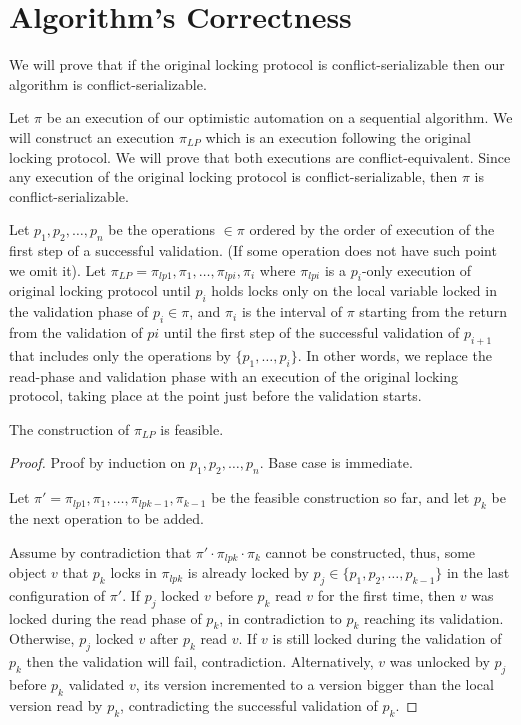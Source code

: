 \section{Algorithm's Correctness} 
We will prove that if the original locking protocol is 
conflict-serializable then our algorithm is conflict-serializable.

Let $\pi$ be an execution of our optimistic automation on a 
sequential algorithm. We will construct an execution $\pi_{LP}$ 
which is an execution following the original locking protocol. 
We will prove that both executions are conflict-equivalent. 
Since any execution of the original locking protocol
is conflict-serializable, then $\pi$ is conflict-serializable. 

Let $p_1,p_2,\ldots,p_n$ be the operations $\in\pi$ ordered by the 
order of execution of the first step of a successful \readSet 
validation. (If some operation does not have such point we omit it).
Let $\pi_{LP} = \pi_{lp1},\pi_{1},\ldots,\pi_{lpi},\pi_{i}$ where 
$\pi_{lpi}$ is a $p_i$-only execution of original locking protocol 
until $p_i$ holds locks only on the local variable locked
in the validation phase of $p_i \in \pi$, and $\pi_i$ is
the interval of $\pi$ starting from the return from the validation of
$pi$ until the first step of the successful \readSet validation of 
$p_{i+1}$ that includes only the operations by $\{p_1,\ldots,p_i\}$.
In other words, we replace the read-phase and validation phase with 
an execution of the original locking protocol, 
taking place at the point just before the \readSet validation starts. 

\begin{lemma}
The construction of $\pi_{LP}$ is feasible.  
\end{lemma}
\begin{proof}
Proof by induction on $p_1,p_2,\ldots,p_n$. Base case is immediate. 

Let $\pi' = \pi_{lp1},\pi_{1},\ldots,\pi_{lpk-1},\pi_{k-1}$ be the feasible
construction so far, and let $p_{k}$ be the next operation to be 
added. 

Assume by contradiction that $\pi'\cdot\pi_{lpk}\cdot\pi_{k}$ 
cannot be constructed, thus, some object $v$ that $p_{k}$ locks 
in $\pi_{lpk}$ is already locked 
by $p_j \in \{p_1,p_2,\ldots,p_{k-1}\}$ in
the last configuration of $\pi'$. 
If $p_j$ locked $v$ before $p_k$ read $v$ for the first time, 
then $v$ was locked during the read phase of $p_k$, 
in contradiction to $p_k$ reaching its validation. 
Otherwise, $p_j$ locked $v$ after $p_k$ read $v$. 
If $v$ is still locked during the validation of $p_k$ then 
the validation will fail, contradiction. Alternatively, $v$ 
was unlocked by $p_j$ before $p_k$ validated $v$, 
its version incremented to a version bigger 
than the local version read by $p_k$, 
contradicting the successful validation of $p_k$.  
\end{proof}

